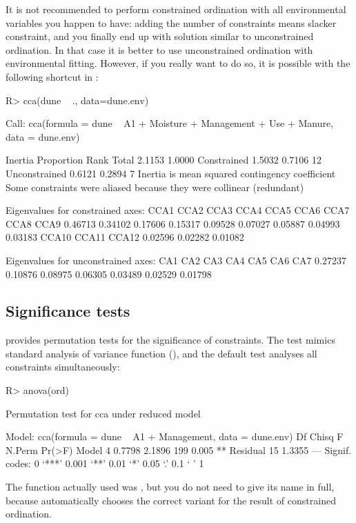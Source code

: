 \documentclass[article,nojss]{jss}
\begin{document}
It is not recommended to perform constrained ordination with all
environmental variables you happen to have: adding the number of
constraints means slacker constraint, and you finally end up with
solution similar to unconstrained ordination. In that case it is
better to use unconstrained ordination with environmental fitting.
However, if you really want to do so, it is possible with the
following shortcut in :
\begin{Schunk}
\begin{Sinput}
R> cca(dune ~ ., data=dune.env)
\end{Sinput}
\begin{Soutput}
Call: cca(formula = dune ~ A1 + Moisture + Management + Use +
Manure, data = dune.env)

              Inertia Proportion Rank
Total          2.1153     1.0000     
Constrained    1.5032     0.7106   12
Unconstrained  0.6121     0.2894    7
Inertia is mean squared contingency coefficient 
Some constraints were aliased because they were collinear (redundant)

Eigenvalues for constrained axes:
   CCA1    CCA2    CCA3    CCA4    CCA5    CCA6    CCA7    CCA8    CCA9 
0.46713 0.34102 0.17606 0.15317 0.09528 0.07027 0.05887 0.04993 0.03183 
  CCA10   CCA11   CCA12 
0.02596 0.02282 0.01082 

Eigenvalues for unconstrained axes:
    CA1     CA2     CA3     CA4     CA5     CA6     CA7 
0.27237 0.10876 0.08975 0.06305 0.03489 0.02529 0.01798 
\end{Soutput}
\end{Schunk}

\subsection{Significance tests}

 provides permutation tests for the significance of
constraints.  The test mimics standard analysis of variance function
(), and the default test analyses all constraints
simultaneously:
\begin{Schunk}
\begin{Sinput}
R> anova(ord)
\end{Sinput}
\begin{Soutput}
Permutation test for cca under reduced model

Model: cca(formula = dune ~ A1 + Management, data = dune.env)
         Df  Chisq      F N.Perm Pr(>F)   
Model     4 0.7798 2.1896    199  0.005 **
Residual 15 1.3355                        
---
Signif. codes:  0 ‘***’ 0.001 ‘**’ 0.01 ‘*’ 0.05 ‘.’ 0.1 ‘ ’ 1
\end{Soutput}
\end{Schunk}
The function actually used was , but you do not need
to give its name in full, because  automatically chooses the
correct  variant for the result of constrained
ordination.
\end{document}
